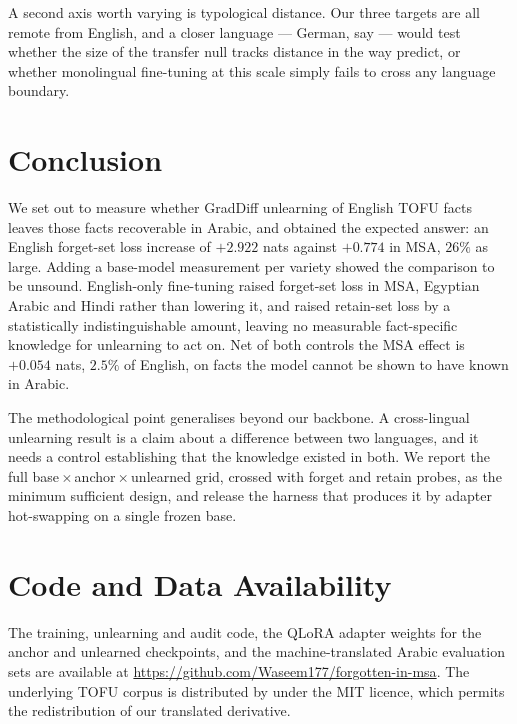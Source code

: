 \documentclass[11pt]{article}
\begin{document}
A second axis worth varying is typological distance. Our three targets are
all remote from English, and a closer language — German, say — would test
whether the size of the transfer null tracks distance in the way
\citet{farashah2026multilingual} predict, or whether monolingual fine-tuning
at this scale simply fails to cross any language boundary.

\section{Conclusion}
\label{sec:conclusion}

We set out to measure whether GradDiff unlearning of English TOFU facts
leaves those facts recoverable in Arabic, and obtained the expected answer:
an English forget-set loss increase of $+2.922$ nats against $+0.774$ in MSA,
$26\%$ as large. Adding a base-model measurement per variety showed the
comparison to be unsound. English-only fine-tuning raised forget-set loss in
MSA, Egyptian Arabic and Hindi rather than lowering it, and raised retain-set
loss by a statistically indistinguishable amount, leaving no measurable
fact-specific knowledge for unlearning to act on. Net of both controls the
MSA effect is $+0.054$ nats, $2.5\%$ of English, on facts the model cannot be
shown to have known in Arabic.

The methodological point generalises beyond our backbone. A cross-lingual
unlearning result is a claim about a difference between two languages, and it
needs a control establishing that the knowledge existed in both. We report
the full base\,$\times$\,anchor\,$\times$\,unlearned grid, crossed with
forget and retain probes, as the minimum sufficient design, and release the
harness that produces it by adapter hot-swapping on a single frozen base.

\section*{Code and Data Availability}

The training, unlearning and audit code, the QLoRA adapter weights for the
anchor and unlearned checkpoints, and the machine-translated Arabic
evaluation sets are available at
\url{https://github.com/Waseem177/forgotten-in-msa}. The underlying TOFU
corpus is distributed by \citet{maini2024tofu} under the MIT licence, which
permits the redistribution of our translated derivative.
\end{document}
